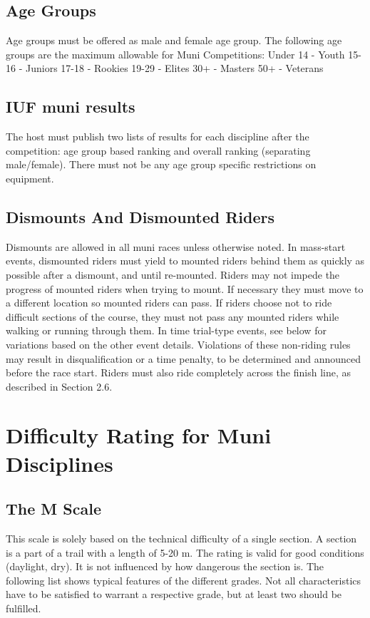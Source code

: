 \subsection{Age Groups}
Age groups must be offered as male and female age group.
The following age groups are the maximum allowable for Muni Competitions:
Under 14 - Youth
15-16 - Juniors
17-18 - Rookies
19-29 - Elites
30+ - Masters
50+ - Veterans

\subsection{IUF muni results}
The host must publish two lists of results for each discipline after the
competition: age group based ranking and overall ranking (separating
male/female). There must not be any age group specific restrictions on
equipment.

\subsection{Dismounts And Dismounted Riders}
Dismounts are allowed in all muni races unless otherwise noted. In mass-start
events, dismounted riders must yield to mounted riders behind them as quickly as
possible after a dismount, and until re-mounted. Riders may not impede the
progress of mounted riders when trying to mount. If necessary they must move to
a different location so mounted riders can pass. If riders choose not to ride
difficult sections of the course, they must not pass any mounted riders while
walking or running through them. In time trial-type events, see below for
variations based on the other event details. Violations of these non-riding
rules may result in disqualification or a time penalty, to be determined and
announced before the race start. Riders must also ride completely across the
finish line, as described in Section 2.6. %

\section{Difficulty Rating for Muni Disciplines}

\subsection{The M Scale}

This scale is solely based on the technical difficulty of a single section. A
section is a part of a trail with a length of 5-20 m. The rating is valid for
good conditions (daylight, dry). It is not influenced by how dangerous the
section is. The following list shows typical features of the different grades.
Not all characteristics have to be satisfied to warrant a respective grade, but
at least two should be fulfilled.

